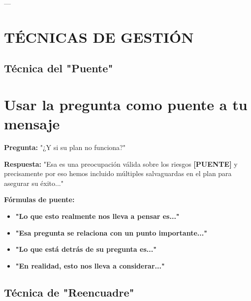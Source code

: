 \documentclass[a4paper,11pt]{article}
\begin{document}
\vspace{0.2cm}

---

\vspace{0.2cm}

\section{TÉCNICAS DE GESTIÓN}

\vspace{0.2cm}

\subsection{Técnica del "Puente"}

\vspace{0.2cm}

\section{Usar la pregunta como puente a tu mensaje}

\textbf{Pregunta:} "¿Y si su plan no funciona?"

\vspace{0.2cm}

\textbf{Respuesta:} "Esa es una preocupación válida sobre los riesgos \textbf{[PUENTE]} y precisamente por eso hemos incluido múltiples salvaguardas en el plan para asegurar su éxito..."

\vspace{0.2cm}

\textbf{Fórmulas de puente:}

\begin{itemize}

  \item \textbf{"Lo que esto realmente nos lleva a pensar es..."}

  \item \textbf{"Esa pregunta se relaciona con un punto importante..."}

  \item \textbf{"Lo que está detrás de su pregunta es..."}

  \item \textbf{"En realidad, esto nos lleva a considerar..."}

\end{itemize}

\vspace{0.2cm}

\subsection{Técnica de "Reencuadre"}
\end{document}
